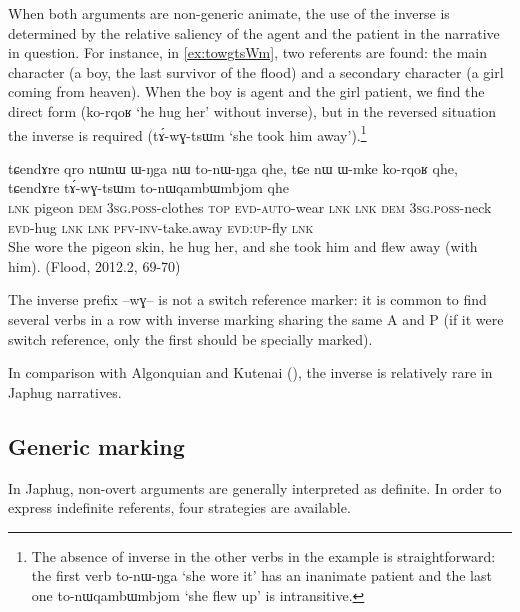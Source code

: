 \documentclass[oldfontcommands,oneside,a4paper,11pt]{article}
\newcommand{\ipa}[1]{{\phon \mbox{#1}}} %
\begin{document}
 
When both arguments are non-generic animate, the use of the inverse is determined by the relative saliency of the agent and the patient in the narrative in question. For instance, in \ref{ex:towgtsWm}, two referents are found: the main character (a boy, the last survivor of the flood) and a secondary character (a girl coming from heaven). When the boy is agent and the girl patient, we find the direct form (\ipa{ko-rqoʁ}  `he hug her' without inverse), but in the reversed situation the inverse is required (\ipa{tɤ́-wɣ-tsɯm} `she took him away').\footnote{The absence of inverse in the other verbs in the example is straightforward: the first verb 	\ipa{to-nɯ-ŋga}  `she wore it' has an inanimate patient and the last one \ipa{to-nɯqambɯmbjom}  `she flew up' is intransitive. }

 \begin{exe}
\ex \label{ex:towgtsWm} 
\gll
\ipa{tɕendɤre} 	\ipa{qro} 	\ipa{nɯnɯ} 	\ipa{ɯ-ŋga} 	\ipa{nɯ} 	\ipa{to-nɯ-ŋga} 	\ipa{qhe,}  \ipa{tɕe} 	\ipa{nɯ} 	\ipa{ɯ-mke} 	\ipa{ko-rqoʁ} 	\ipa{qhe,} \ipa{tɕendɤre} 	\ipa{tɤ́-wɣ-tsɯm} 	\ipa{to-nɯqambɯmbjom} 	\ipa{qhe} \\
\textsc{lnk} pigeon \textsc{dem} \textsc{3sg.poss}-clothes \textsc{top} \textsc{evd-auto}-wear \textsc{lnk} \textsc{lnk} \textsc{dem} \textsc{3sg.poss}-neck \textsc{evd}-hug \textsc{lnk} \textsc{lnk} \textsc{pfv-inv}-take.away \textsc{evd:up}-fly \textsc{lnk} \\
\glt She wore the pigeon skin, he hug her, and she took him and flew away (with him). (Flood, 2012.2, 69-70)
\end{exe}

The inverse prefix \ipa{--wɣ--} is not a switch reference marker: it is common to find several verbs in a row with inverse marking sharing the same A and P (if it were switch reference, only the first should be specially marked).

In comparison with Algonquian and Kutenai (\citealt{dryer94inverse}), the inverse is relatively rare in Japhug narratives.

\subsection{Generic marking}  \label{sec:genr.jpg}

In Japhug, non-overt arguments are generally interpreted as definite. In order to express indefinite referents, four strategies are available. 
\end{document}
